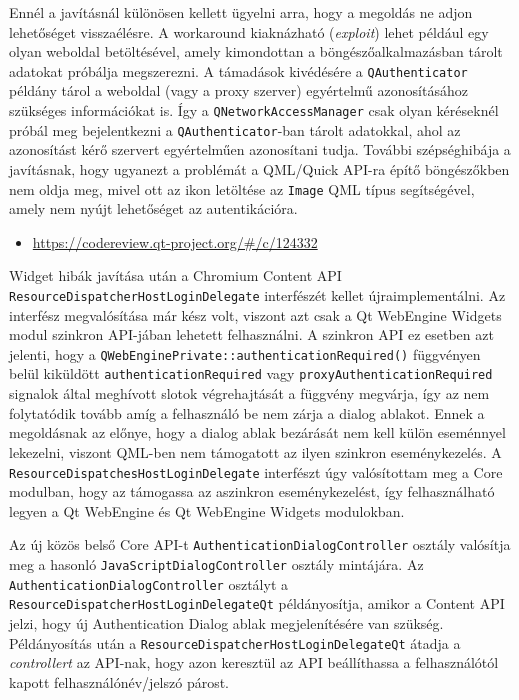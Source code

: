 \documentclass[12pt]{report}
\let\origurl\url
\renewcommand{\url}[1]{%
    \textcolor{blue}{\origurl{#1}}
}
\newcommand{\gerrit}[1]{%
    \textcolor{qtgreen}{\origurl{https://codereview.qt-project.org/\#/c/#1}}
}
\begin{document}
Ennél a javításnál különösen kellett ügyelni arra, hogy a megoldás ne adjon lehetőséget
visszaélésre. A workaround kiaknázható (\textit{exploit}) lehet például egy olyan weboldal
betöltésével, amely kimondottan a böngészőalkalmazásban tárolt adatokat próbálja megszerezni.
A támadások kivédésére a \texttt{QAuthenticator} példány tárol a weboldal (vagy a proxy
szerver) egyértelmű azonosításához szükséges információkat is. Így a
\texttt{QNetworkAccessManager} csak olyan kéréseknél próbál meg bejelentkezni a
\texttt{QAuthenticator}-ban tárolt adatokkal, ahol az azonosítást kérő szervert egyértelműen
azonosítani tudja. További szépséghibája a javításnak, hogy ugyanezt a problémát a QML/Quick
API-ra építő böngészőkben nem oldja meg, mivel ott az ikon letöltése az \texttt{Image} QML
típus segítségével, amely nem nyújt lehetőséget az autentikációra.

\begin{center}
    \begin{reviewbox}
        \begin{itemize}
            \renewcommand{\labelitemi}{\textcolor{qtgreen}{$\blacktriangleright$}}
            \item \gerrit{124332}
        \end{itemize}
    \end{reviewbox}
\end{center}

Widget hibák javítása után a Chromium Content API \texttt{ResourceDispatcherHostLoginDelegate}
interfészét kellet újraimplementálni. Az interfész megvalósítása már kész volt, viszont azt
csak a Qt WebEngine Widgets modul szinkron API-jában lehetett felhasználni. A szinkron API ez
esetben azt jelenti, hogy a \texttt{QWebEnginePrivate::authenticationRequired()} függvényen
belül kiküldött \texttt{authenticationRequired} vagy \texttt{proxyAuthenticationRequired}
signalok által meghívott slotok végrehajtását a függvény megvárja, így az nem folytatódik
tovább amíg a felhasználó be nem zárja a dialog ablakot. Ennek a megoldásnak az előnye, hogy
a dialog ablak bezárását nem kell külön eseménnyel lekezelni, viszont QML-ben nem támogatott
az ilyen szinkron eseménykezelés. A \texttt{ResourceDispatchesHostLoginDelegate} interfészt
úgy valósítottam meg a Core modulban, hogy az támogassa az aszinkron eseménykezelést, így
felhasználható legyen a Qt WebEngine és Qt WebEngine Widgets modulokban.

Az új közös belső Core API-t \texttt{AuthenticationDialogController} osztály valósítja meg
a hasonló \texttt{JavaScriptDialogController} osztály mintájára.
Az \texttt{AuthenticationDialogController} osztályt a
\texttt{ResourceDispatcherHostLoginDelegateQt} példányosítja, amikor a Content API jelzi,
hogy új Authentication Dialog ablak megjelenítésére van szükség. Példányosítás után a
\texttt{ResourceDispatcherHostLoginDelegateQt} átadja a \textit{controllert} az API-nak,
hogy azon keresztül az API beállíthassa a felhasználótól kapott felhasználónév/jelszó párost.
\end{document}
